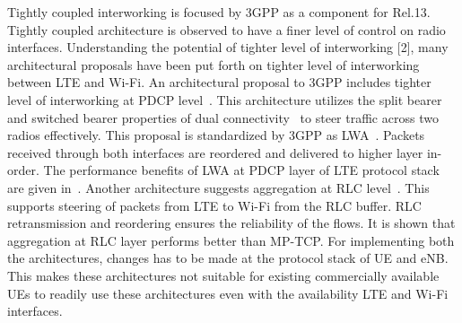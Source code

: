 \documentclass[conference]{IEEEtran}
\begin{document}
Tightly coupled interworking is focused by 3GPP as a component for Rel.13. Tightly coupled architecture is observed to have a finer level of control on radio interfaces. Understanding the potential of tighter level of interworking [2], many architectural proposals have been put forth on tighter level of interworking between LTE and Wi-Fi.  An architectural proposal to 3GPP includes tighter level of interworking at PDCP level~\cite{R3151743}. This architecture utilizes the split bearer and switched bearer properties of dual connectivity~\cite{TS36842} to steer traffic across two radios effectively. This proposal is standardized by 3GPP as LWA~\cite{36300}. Packets received through both interfaces are reordered and delivered to higher layer in-order. The performance benefits of LWA at PDCP layer of LTE protocol stack are given in~\cite{lagrange2014very}. Another architecture suggests aggregation at RLC level~\cite{RP150180}. This supports steering of packets from LTE to Wi-Fi from the RLC buffer. RLC retransmission and reordering ensures the reliability of the flows. It is shown that aggregation at RLC layer performs better than MP-TCP. For implementing both the architectures, changes has to be made at the protocol stack of UE and eNB. This makes these architectures not suitable for existing commercially available UEs to readily use these architectures even with the availability LTE and Wi-Fi interfaces.
\end{document}
